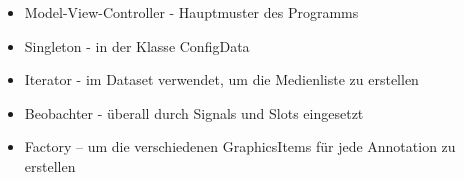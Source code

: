 \begin{itemize}
\item Model-View-Controller - Hauptmuster des Programms
\item Singleton - in der Klasse ConfigData  
\item Iterator - im Dataset verwendet, um die Medienliste zu erstellen 
\item Beobachter - überall durch Signals und Slots eingesetzt
\item Factory – um die verschiedenen GraphicsItems für jede Annotation zu erstellen
\end{itemize}